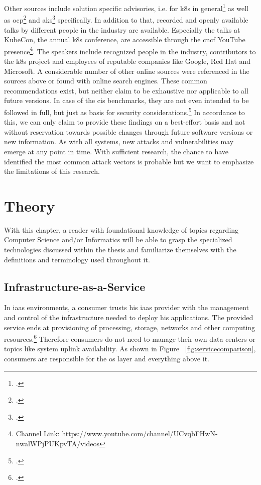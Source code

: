 Other sources include solution specific advisories, i.e. for \gls{k8s} in general\footcite{k8sDocsSecurity} as well as \gls{ocp}\footcite{ocpSecTips} and \gls{aks}\footcite{aksSecTips} specifically. In addition to that, recorded and openly available talks by different people in the industry are available. Especially the talks at KubeCon, the annual \gls{k8s} conference, are accessible through the \gls{cncf} YouTube presence\footnote{Channel Link: https://www.youtube.com/channel/UCvqbFHwN-nwalWPjPUKpvTA/videos}. The speakers include recognized people in the industry, contributors to the \gls{k8s} project and employees of reputable companies like Google, Red Hat and Microsoft.
A considerable number of other online sources were referenced in the sources above or found with online search engines.
These common recommendations exist, but neither claim to be exhaustive nor applicable to all future versions. In case of the \gls{cis} benchmarks, they are not even intended to be followed in full, but just as basis for security considerations.\footcite[][, starting at 29:18]{cisJustRecommendation}
In accordance to this, we can only claim to provide these findings on a best-effort basis and not without reservation towards possible changes through future software versions or new information.
As with all systems, new attacks and vulnerabilities may emerge at any point in time. With sufficient research, the chance to have identified the most common attack vectors is probable but we want to emphasize the limitations of this research.


\chapter{Theory}
With this chapter, a reader with foundational knowledge of topics regarding Computer Science and/or Informatics 
will be able to grasp the specialized technologies discussed within the thesis and familiarize themselves with the definitions and terminology used throughout it.

\section{Infrastructure-as-a-Service}
In \gls{iaas} environments, a consumer trusts his \gls{iaas} provider with the management and control of the infrastructure needed to deploy his applications.
The provided service ends at provisioning of processing, storage, networks and other computing resources.\footcite[][p. 2 to 3]{nistcloud}
Therefore consumers do not need to manage their own data centers or topics like system uplink availability.
As shown in Figure ~\ref{fig:servicecomparison}, consumers are responsible for the \gls{os} layer and everything above it.

